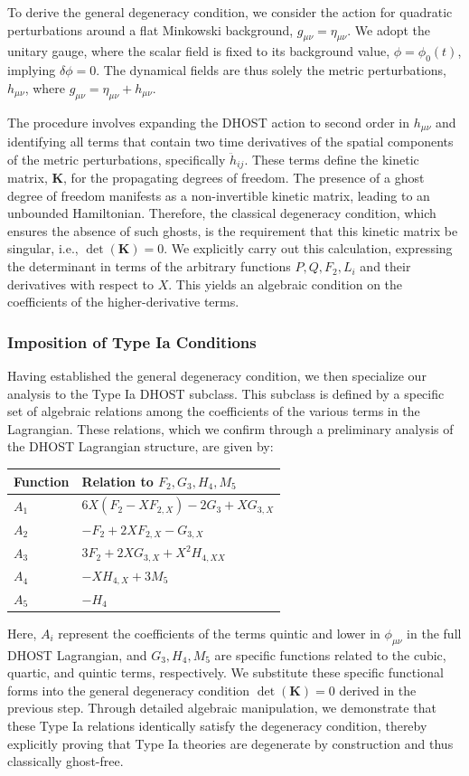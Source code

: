 \documentclass[twocolumn]{aastex631}
\begin{document}
To derive the general degeneracy condition, we consider the action for quadratic perturbations around a flat Minkowski background, $g_{\mu\nu} = \eta_{\mu\nu}$. We adopt the unitary gauge, where the scalar field is fixed to its background value, $\phi = \phi_0(t)$, implying $\delta\phi = 0$. The dynamical fields are thus solely the metric perturbations, $h_{\mu\nu}$, where $g_{\mu\nu} = \eta_{\mu\nu} + h_{\mu\nu}$.

The procedure involves expanding the DHOST action to second order in $h_{\mu\nu}$ and identifying all terms that contain two time derivatives of the spatial components of the metric perturbations, specifically $\ddot{h}_{ij}$. These terms define the kinetic matrix, $\mathbf{K}$, for the propagating degrees of freedom. The presence of a ghost degree of freedom manifests as a non-invertible kinetic matrix, leading to an unbounded Hamiltonian. Therefore, the classical degeneracy condition, which ensures the absence of such ghosts, is the requirement that this kinetic matrix be singular, i.e., $\det(\mathbf{K}) = 0$. We explicitly carry out this calculation, expressing the determinant in terms of the arbitrary functions $P, Q, F_2, L_i$ and their derivatives with respect to $X$. This yields an algebraic condition on the coefficients of the higher-derivative terms.

\subsubsection*{Imposition of Type Ia Conditions}
Having established the general degeneracy condition, we then specialize our analysis to the Type Ia DHOST subclass. This subclass is defined by a specific set of algebraic relations among the coefficients of the various terms in the Lagrangian. These relations, which we confirm through a preliminary analysis of the DHOST Lagrangian structure, are given by:
\begin{center}
\begin{tabular}{|l|l|}
\hline
Function & Relation to $F_2, G_3, H_4, M_5$ \\
\hline
$A_1$ & $6X(F_2 - X F_{2,X}) - 2G_3 + X G_{3,X}$ \\
$A_2$ & $-F_2 + 2X F_{2,X} - G_{3,X}$ \\
$A_3$ & $3F_2 + 2X G_{3,X} + X^2 H_{4,XX}$ \\
$A_4$ & $-X H_{4,X} + 3M_5$ \\
$A_5$ & $-H_4$ \\
\hline
\end{tabular}
\end{center}
Here, $A_i$ represent the coefficients of the terms quintic and lower in $\phi_{\mu\nu}$ in the full DHOST Lagrangian, and $G_3, H_4, M_5$ are specific functions related to the cubic, quartic, and quintic terms, respectively. We substitute these specific functional forms into the general degeneracy condition $\det(\mathbf{K}) = 0$ derived in the previous step. Through detailed algebraic manipulation, we demonstrate that these Type Ia relations identically satisfy the degeneracy condition, thereby explicitly proving that Type Ia theories are degenerate by construction and thus classically ghost-free.
\end{document}

